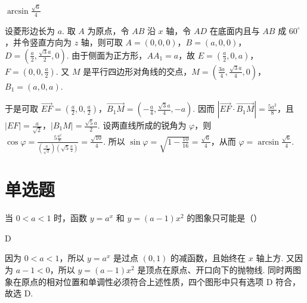 \begin{answer}
\(\arcsin \frac{\sqrt{6}}{4}\)
\end{answer}

\begin{solution}
设菱形边长为 \(a\). 取 \(A\) 为原点，令 \(AB\) 沿 \(x\) 轴，令 \(AD\) 在底面内且与 \(AB\) 成 \(60^\circ\)，并令竖直方向为 \(z\) 轴，则可取 \(A=(0,0,0)\)，\(B=(a,0,0)\)，\(D=\left(\frac{a}{2},\frac{\sqrt{3}a}{2},0\right)\). 由于侧面为正方形，\(AA_1=a\)，故 \(E=\left(\frac{a}{2},0,a\right)\)，\(F=\left(0,0,\frac{a}{2}\right)\). 又 \(M\) 是平行四边形对角线的交点，\(M=\left(\frac{3a}{4},\frac{\sqrt{3}a}{4},0\right)\)，\(B_1=(a,0,a)\).

于是可取 \(\overrightarrow{EF}=\left(\frac{a}{2},0,\frac{a}{2}\right)\)，\(\overrightarrow{B_1M}=\left(-\frac{a}{4},\frac{\sqrt{3}a}{4},-a\right)\). 因而 \(\left|\overrightarrow{EF}\cdot\overrightarrow{B_1M}\right|=\frac{5a^2}{8}\)，且 \(|EF|=\frac{a}{\sqrt{2}}\)，\(|B_1M|=\frac{\sqrt{5}a}{2}\). 设两直线所成的锐角为 \(\varphi\)，则 \(\cos\varphi=\frac{5\frac{a^2}{8}}{(\frac{a}{\sqrt{2}})(\sqrt{5}\frac{a}{2})}=\frac{\sqrt{10}}{4}\). 所以 \(\sin\varphi=\sqrt{1-\frac{10}{16}}=\frac{\sqrt{6}}{4}\)，从而 \(\varphi=\arcsin\frac{\sqrt{6}}{4}\).
\end{solution}

\section{单选题}

\begin{problem}
当 \(0 < a < 1\) 时，函数 \(y = a^x\) 和 \(y = (a - 1)x^2\) 的图象只可能是（\quad）

    {}
    {}
    {}
\end{problem}

\begin{answer}
D
\end{answer}

\begin{solution}
因为 \(0<a<1\)，所以 \(y=a^x\) 是过点 \((0,1)\) 的减函数，且始终在 \(x\) 轴上方. 又因为 \(a-1<0\)，所以 \(y=(a-1)x^2\) 是顶点在原点、开口向下的抛物线. 同时两图象在原点的相对位置和单调性必须符合上述性质，四个图形中只有选项 D 符合，故选 D.
\end{solution}

